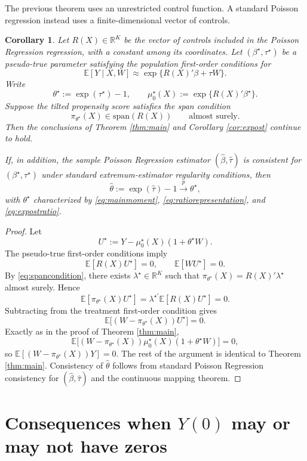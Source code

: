 \documentclass[11pt]{article}
\newtheorem{corollary}[theorem]{Corollary}
\newcommand{\E}{\mathbb{E}}
\newcommand{\1}{\mathbf{1}}
\newcommand{\R}{\mathbb{R}}
\begin{document}
The previous theorem uses an unrestricted control function. A standard Poisson regression instead uses a finite-dimensional vector of controls.

\begin{corollary}
\label{cor:finite}
Let $R(X)\in\R^K$ be the vector of controls included in the Poisson Regression regression, with a constant among its coordinates. Let $(\beta^\star,\tau^\star)$ be a pseudo-true parameter satisfying the population first-order conditions for
\[
\E[Y\mid X,W]\approx \exp\{R(X)'\beta+\tau W\}.
\]
Write
\[
\theta^\star:=\exp(\tau^\star)-1,
\qquad
\mu_0^\star(X):=\exp\{R(X)'\beta^\star\}.
\]
Suppose the tilted propensity score satisfies the span condition
\begin{equation}
\pi_{\theta^\star}(X)\in \mathrm{span}(R(X))
\qquad \text{almost surely.}
\label{eq:spancondition}
\end{equation}
Then the conclusions of Theorem \ref{thm:main} and Corollary \ref{cor:expost} continue to hold.

If, in addition, the sample Poisson Regression estimator $(\hat\beta,\hat\tau)$ is consistent for $(\beta^\star,\tau^\star)$ under standard extremum-estimator regularity conditions, then
\[
\hat\theta:=\exp(\hat\tau)-1 \xrightarrow{p} \theta^\star,
\]
with $\theta^\star$ characterized by \eqref{eq:mainmoment}, \eqref{eq:ratiorepresentation}, and \eqref{eq:expostratio}.
\end{corollary}

\begin{proof}
Let
\[
U^\star:=Y-\mu_0^\star(X)(1+\theta^\star W).
\]
The pseudo-true first-order conditions imply
\[
\E[R(X)U^\star]=0,
\qquad
\E[WU^\star]=0.
\]
By \eqref{eq:spancondition}, there exists $\lambda^\star\in\R^K$ such that $\pi_{\theta^\star}(X)=R(X)'\lambda^\star$ almost surely. Hence
\[
\E[\pi_{\theta^\star}(X)U^\star]=\lambda^{\star\prime}\E[R(X)U^\star]=0.
\]
Subtracting from the treatment first-order condition gives
\[
\E\Big[(W-\pi_{\theta^\star}(X))U^\star\Big]=0.
\]
Exactly as in the proof of Theorem \ref{thm:main},
\[
\E\Big[(W-\pi_{\theta^\star}(X))\mu_0^\star(X)(1+\theta^\star W)\Big]=0,
\]
so $\E[(W-\pi_{\theta^\star}(X))Y]=0$. The rest of the argument is identical to Theorem \ref{thm:main}. Consistency of $\hat\theta$ follows from standard Poisson Regression consistency for $(\hat\beta,\hat\tau)$ and the continuous mapping theorem.
\end{proof}

\section{Consequences when \texorpdfstring{$Y(0)$}{Y(0)} may or may not have zeros}
\end{document}
